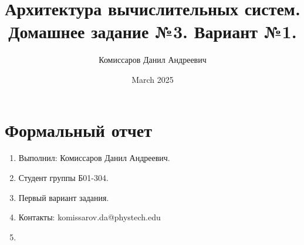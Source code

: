 

\title{Архитектура вычислительных систем. Домашнее задание №3. Вариант №1.}
\author{Комиссаров Данил Андреевич}
\date{March 2025}



\section{Формальный отчет}
\begin{enumerate}
    \item Выполнил: Комиссаров Данил Андреевич.
    \item Студент группы Б01-304.
    \item Первый вариант задания.
    \item Контакты: komissarov.da@phystech.edu
    \item
\end{enumerate}
